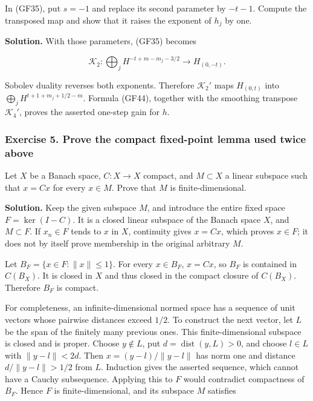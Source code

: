 \documentclass[
  11pt,
]{article}
\begin{document}
In (GF35), put \(s=-1\) and replace its second parameter by \(-t-1\).
Compute the transposed map and show that it raises the exponent of
\(h_j\) by one.

\textbf{Solution.} With those parameters, (GF35) becomes

\[
 \mathscr K_2:
 \bigoplus_jH^{-t+m-m_j-3/2}
 \longrightarrow H_{(0,-t)}.
 \tag{GF64}
\]

Sobolev duality reverses both exponents. Therefore \(\mathscr K_2'\)
maps \(H_{(0,t)}\) into \(\bigoplus_jH^{t+1+m_j+1/2-m}\). Formula
(GF44), together with the smoothing transpose \(\mathscr K_4'\), proves
the asserted one-step gain for \(h\).

\subsubsection{Exercise 5. Prove the compact fixed-point lemma used
twice
above}\label{exercise-5.-prove-the-compact-fixed-point-lemma-used-twice-above}

Let \(X\) be a Banach space, \(C:X\to X\) compact, and \(M\subset X\) a
linear subspace such that \(x=Cx\) for every \(x\in M\). Prove that
\(M\) is finite-dimensional.

\textbf{Solution.} Keep the given subspace \(M\), and introduce the
entire fixed space \(F=\ker(I-C)\). It is a closed linear subspace of
the Banach space \(X\), and \(M\subset F\). If \(x_n\in F\) tends to
\(x\) in \(X\), continuity gives \(x=Cx\), which proves \(x\in F\); it
does not by itself prove membership in the original arbitrary \(M\).

Let \(B_F=\{x\in F:\|x\|\leq1\}\). For every \(x\in B_F\), \(x=Cx\), so
\(B_F\) is contained in \(C(B_X)\). It is closed in \(X\) and thus
closed in the compact closure of \(C(B_X)\). Therefore \(B_F\) is
compact.

For completeness, an infinite-dimensional normed space has a sequence of
unit vectors whose pairwise distances exceed \(1/2\). To construct the
next vector, let \(L\) be the span of the finitely many previous ones.
This finite-dimensional subspace is closed and is proper. Choose
\(y\notin L\), put \(d=\operatorname{dist}(y,L)>0\), and choose
\(l\in L\) with \(\|y-l\|<2d\). Then \(x=(y-l)/\|y-l\|\) has norm one
and distance \(d/\|y-l\|>1/2\) from \(L\). Induction gives the asserted
sequence, which cannot have a Cauchy subsequence. Applying this to \(F\)
would contradict compactness of \(B_F\). Hence \(F\) is
finite-dimensional, and its subspace \(M\) satisfies
\end{document}
